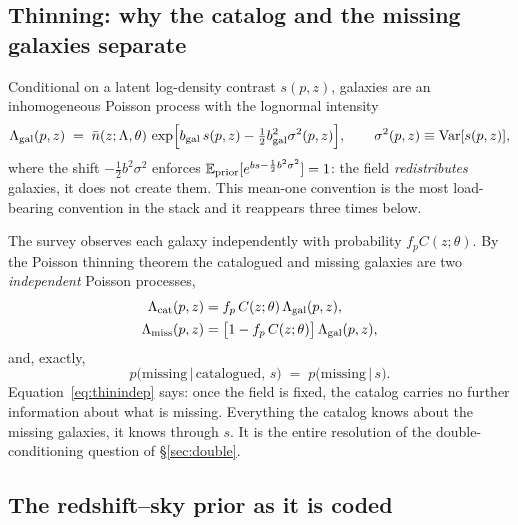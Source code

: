 \documentclass[11pt]{article}
\theoremstyle{definition}
\theoremstyle{remark}
\newcommand{\bgal}{b_{\rm gal}}
\newcommand{\nbar}{\bar n}
\newcommand{\Lmiss}{\Lambda_{\rm miss}}
\newcommand{\Lcat}{\Lambda_{\rm cat}}
\newcommand{\Lgal}{\Lambda_{\rm gal}}
\newcommand{\Var}{\mathrm{Var}}
\begin{document}
\subsection{Thinning: why the catalog and the missing galaxies separate}

Conditional on a latent log-density contrast $s(p,z)$, galaxies are an
inhomogeneous Poisson process with the lognormal intensity
\begin{equation}
  \Lgal(p,z)\;=\;\nbar(z;\Lambda,\theta)\,
  \exp\!\Big[\bgal\,s(p,z)-\tfrac12\bgal^2\sigma^2(p,z)\Big],
  \qquad \sigma^2(p,z)\equiv\Var[s(p,z)],
  \label{eq:galintensity}
\end{equation}
where the shift $-\tfrac12 b^2\sigma^2$ enforces
$\mathbb E_{\rm prior}[e^{bs-\frac12b^2\sigma^2}]=1$: the field \emph{redistributes}
galaxies, it does not create them. This mean-one convention is the most
load-bearing convention in the stack and it reappears three times below.

The survey observes each galaxy independently with probability $f_pC(z;\theta)$.
By the Poisson thinning theorem the catalogued and missing galaxies are two
\emph{independent} Poisson processes,
\begin{align}
  \Lcat(p,z) &= f_p\,C(z;\theta)\,\Lgal(p,z), \label{eq:thincat}\\
  \Lmiss(p,z) &= \big[1-f_p\,C(z;\theta)\big]\,\Lgal(p,z),
  \label{eq:thinmiss}
\end{align}
and, exactly,
\begin{equation}
  p\big(\text{missing}\,\big|\,\text{catalogued},\,s\big)
  \;=\;p\big(\text{missing}\,\big|\,s\big).
  \label{eq:thinindep}
\end{equation}
Equation~\eqref{eq:thinindep} says: once the field is fixed, the catalog carries
no further information about what is missing. Everything the catalog knows about
the missing galaxies, it knows through $s$. It is the entire resolution of the
double-conditioning question of \S\ref{sec:double}.

\subsection{The redshift--sky prior as it is coded}
\end{document}
